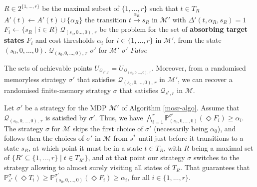 \begin{algorithm}[h!]
\begin{algorithmic}[1]
{}
   $R \in 2^{\{1, \dots, r\}}$ be the maximal subset  of $\{1, \dots, r\}$ such that $t \in T_R$ \label{line-max-subset}
      \STATE $A'(t) \leftarrow A'(t) \cup \{\alpha_R\}$
       the transition $t \xrightarrow{\alpha_R}s_R$ in $\mathcal{M}'$ with $\Delta'(t, \alpha_R, s_R) = 1$
\ENDFOR
{}
  \STATE $F_i \leftarrow \{ s_R \; | \; i \in R \}$
\ENDFOR
{} $\mathcal{Q}_{(s_0, 0 \dots, 0),\, r}$ be the \MOSR{} problem for the set of \textbf{absorbing target states} $F_i$ and cost thresholds $\alpha_i$ for $i \in \{1, \dots, r\}$ in $\mathcal{M}'$, from the state $(s_0, 0, \dots, 0)$.
 $\mathcal{Q}_{(s_0, 0, \dots, 0),\, r}$ 
   $\sigma'$ for $\mathcal{M}'$
  \RETURN $\sigma'$
\ELSE
  \RETURN $False$
\ENDIF
\end{algorithmic}
\end{algorithm}

\begin{lemma}
  The sets of achievable points $U_{\mathcal{Q}_{s^*, r}} = U_{\mathcal{Q}_{(s_0,0, \dots, 0),\, r}}$. Moreover, from a randomised memoryless strategy $\sigma'$ that satisfies $\mathcal{Q}_{(s_0, 0, \dots, 0), \, r}$ in $\mathcal{M}'$, we can recover a randomised finite-memory strategy $\sigma$ that satisfies $\mathcal{Q}_{s^*, r}$ in $\mathcal{M}$.
\end{lemma}

\begin{proof2}
  Let $\sigma'$ be a strategy for the MDP $\mathcal{M}'$ of Algorithm \ref{mosr-algo}.
  Assume that $\mathcal{Q}_{(s_0, 0, \dots, 0),\, r}$ is satisfied by $\sigma'$. Thus, we have $\bigwedge_{i=1}^r\mathbb{P}_{(s_0, 0, \dots, 0)}^{\sigma'}(\Diamond F_i) \geq \alpha_i$.
  The strategy $\sigma$ for $\mathcal{M}$ skips the first choice of $\sigma'$ (necessarily being $\alpha_0$), and follows then the choices of $\sigma'$ in $\mathcal{M}$ from $s^*$ until just before it transitions to a state $s_R$, at which point it must be in a state $t \in T_R$, with $R$ being a maximal set of $\{ R' \subseteq \{1, \dots, r\} \; | \; t \in T_{R'} \}$, and at
  that point our strategy $\sigma$ switches to the strategy allowing to almost surely visiting all states of $T_R$. That guarantees that $\mathbb{P}_{s^*}^\sigma(\Diamond T_i) \geq \mathbb{P}_{(s_0, 0, \dots, 0)}^{\sigma'}(\Diamond F_i) \geq \alpha_i$, for all $i \in \{1, \dots, r\}$.
\end{proof2}

